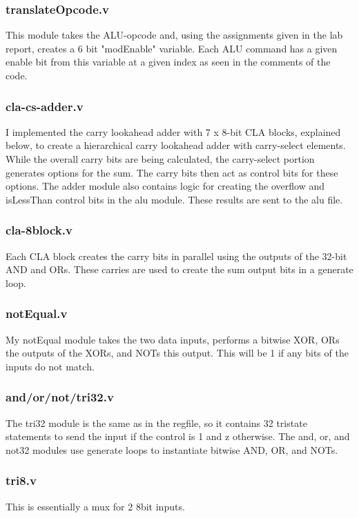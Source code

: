 \documentclass[letterpaper]{article} %
\begin{document}
\subsubsection{translateOpcode.v}
This module takes the ALU-opcode and, using the assignments given in the lab report, creates a 6 bit "modEnable" variable. Each ALU command has a given enable bit from this variable at a given index as seen in the comments of the code.

\subsubsection{cla-cs-adder.v}
I implemented the carry lookahead adder with 7 x 8-bit CLA blocks, explained below, to create a hierarchical carry lookahead adder with carry-select elements. While the overall carry bits are being calculated, the carry-select portion generates options for the sum. The carry bits then act as control bits for these options. The adder module also contains logic for creating the overflow and isLessThan control bits in the alu module. These results are sent to the alu file.

\subsubsection{cla-8block.v}
Each CLA block creates the carry bits in parallel using the outputs of the 32-bit AND and ORs. These carries are used to create the sum output bits in a generate loop.

\subsubsection{notEqual.v}
My notEqual module takes the two data inputs, performs a bitwise XOR, ORs the outputs of the XORs, and NOTs this output. This will be 1 if any bits of the inputs do not match.

\subsubsection{and/or/not/tri32.v}
The tri32 module is the same as in the regfile, so it contains 32 tristate statements to send the input if the control is 1 and z otherwise. The and, or, and not32 modules use generate loops to instantiate bitwise AND, OR, and NOTs.

\subsubsection{tri8.v}
This is essentially a mux for 2 8bit inputs.
\end{document}
